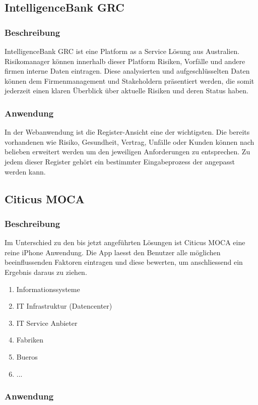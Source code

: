 \subsection{IntelligenceBank GRC}

\subsubsection{Beschreibung}
IntelligenceBank GRC ist eine Platform as a Service Lösung aus Australien. Risikomanager können innerhalb dieser Platform Risiken, Vorfälle und andere firmen interne Daten eintragen. Diese analysierten und aufgeschlüsselten Daten können dem Firmenmanagement und Stakeholdern präsentiert werden, die somit jederzeit einen klaren Überblick über aktuelle Risiken und deren Status haben.
\subsubsection{Anwendung}
In der Webanwendung ist die Register-Ansicht eine der wichtigsten. Die bereits vorhandenen wie Risiko, Gesundheit, Vertrag, Unfälle oder Kunden können nach belieben erweitert werden um den jeweiligen Anforderungen zu entsprechen. Zu jedem dieser Register gehört ein bestimmter Eingabeprozess der angepasst werden kann.\cite{intelligencebank}

\subsection{Citicus MOCA}
\subsubsection{Beschreibung}
Im Unterschied zu den bis jetzt angeführten Lösungen ist Citicus MOCA eine reine iPhone Anwendung. Die App laesst den Benutzer alle möglichen beeinflussenden Faktoren eintragen und diese bewerten, um anschliessend ein Ergebnis daraus zu ziehen.\cite{Citicus}

\begin{enumerate}
\item Informationssysteme
\item IT Infrastruktur (Datencenter)
\item IT Service Anbieter
\item Fabriken
\item Bueros
\item ...
\end{enumerate}

\subsubsection{Anwendung}

